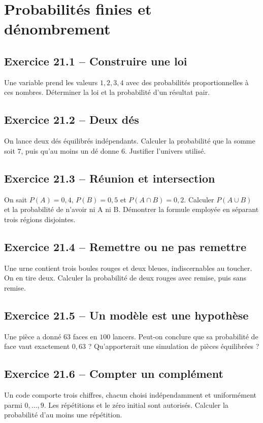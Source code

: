 \chapter{Probabilités finies et dénombrement}
\section*{Exercice 21.1 -- Construire une loi}
Une variable prend les valeurs $1,2,3,4$ avec des probabilités proportionnelles à ces nombres. Déterminer la loi et la probabilité d'un résultat pair.

\section*{Exercice 21.2 -- Deux dés}
On lance deux dés équilibrés indépendants. Calculer la probabilité que la somme soit $7$, puis qu'au moins un dé donne $6$. Justifier l'univers utilisé.

\section*{Exercice 21.3 -- Réunion et intersection}
On sait $P(A)=0{,}4$, $P(B)=0{,}5$ et $P(A\cap B)=0{,}2$. Calculer $P(A\cup B)$ et la probabilité de n'avoir ni A ni B. Démontrer la formule employée en séparant trois régions disjointes.

\section*{Exercice 21.4 -- Remettre ou ne pas remettre}
Une urne contient trois boules rouges et deux bleues, indiscernables au toucher. On en tire deux. Calculer la probabilité de deux rouges avec remise, puis sans remise.

\section*{Exercice 21.5 -- Un modèle est une hypothèse}
Une pièce a donné $63$ faces en $100$ lancers. Peut-on conclure que sa probabilité de face vaut exactement $0{,}63$ ? Qu'apporterait une simulation de pièces équilibrées ?

\section*{Exercice 21.6 -- Compter un complément}
Un code comporte trois chiffres, chacun choisi indépendamment et uniformément parmi $0,\ldots,9$. Les répétitions et le zéro initial sont autorisés. Calculer la probabilité d'au moins une répétition.
